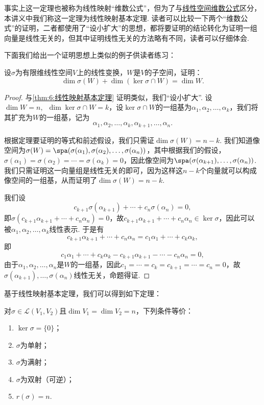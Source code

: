 事实上这一定理也被称为线性映射``维数公式''，但为了与\hyperref[thm:4:维数公式]{线性空间维数公式}区分，本讲义中我们称这一定理为线性映射基本定理. 读者可以比较一下两个``维数公式''的证明，二者都使用了``设小扩大''的思想，都将要证明的结论转化为证明一组向量是线性无关的，但其中证明线性无关的方法略有不同，读者可以仔细体会.

下面我们给出一个证明思想上类似的例子供读者练习：
\begin{example}
    设$\sigma$为有限维线性空间$V$上的线性变换，$W$是$V$的子空间，证明：
    \[\dim\sigma(W)+\dim(\ker\sigma \cap W)=\dim W.\]
\end{example}

\begin{proof}
    与\autoref{thm:6:线性映射基本定理} 证明类似，我们``设小扩大''. 设$\dim W=n,\enspace\dim\ker\sigma\cap W=k$，设$\ker\sigma\cap W$的一组基为$\alpha_1,\alpha_2,\ldots,\alpha_k$，我们将其扩充为$W$的一组基，记为
    \[\alpha_1,\alpha_2,\ldots,\alpha_k,\alpha_{k+1},\ldots,\alpha_n.\]

    根据定理要证明的等式和前述假设，我们只需证$\dim\sigma(W)=n-k$. 我们知道像空间为$\sigma(W)=\spa(\sigma(\alpha_1),\sigma(\alpha_2),\ldots,\sigma(\alpha_n))$，其中根据我们的假设，$\sigma(\alpha_1)=\sigma(\alpha_2)=\cdots=\sigma(\alpha_k)=0$，因此像空间为$\spa(\sigma(\alpha_{k+1}),\ldots,\sigma(\alpha_n))$. 我们只需证明这一向量组是线性无关的即可，因为这样这$n-k$个向量就可以构成像空间的一组基，从而证明了$\dim\sigma(W)=n-k$.

    我们设
    \[c_{k+1}\sigma(\alpha_{k+1})+\cdots+c_n\sigma(\alpha_n)=0,\]
    即$\sigma(c_{k+1}\alpha_{k+1}+\cdots+c_n\alpha_n)=0$，故$c_{k+1}\alpha_{k+1}+\cdots+c_n\alpha_n\in\ker\sigma$，因此可以被$\alpha_1,\alpha_2,\ldots,\alpha_k$线性表示. 于是有
    \[c_{k+1}\alpha_{k+1}+\cdots+c_n\alpha_n=c_1\alpha_1+\cdots+c_k\alpha_k,\]
    即
    \[c_1\alpha_1+\cdots+c_k\alpha_k-c_{k+1}\alpha_{k+1}-\cdots-c_n\alpha_n=0,\]
    由于$\alpha_1,\alpha_2,\ldots,\alpha_n$是$W$的一组基，因此$c_1=\cdots=c_k=c_{k+1}=\cdots=c_n=0$，故$\sigma(\alpha_{k+1}),\ldots,\sigma(\alpha_n)$线性无关，命题得证.
\end{proof}

基于线性映射基本定理，我们可以得到如下定理：
\begin{theorem}\label{thm:6:双射等价条件}
    对$\sigma \in \mathcal{L}(V_1,V_2)$且$\dim V_1=\dim V_2=n$，下列条件等价：
    \begin{enumerate}
        \item \label{item:6:双射等价条件:1}
              $\ker \sigma=\{0\}$；

        \item \label{item:6:双射等价条件:2}
              $\sigma$为单射；

        \item $\sigma$为满射；

        \item $\sigma$为双射（可逆）；

        \item $r(\sigma)=n$.
    \end{enumerate}
\end{theorem}

